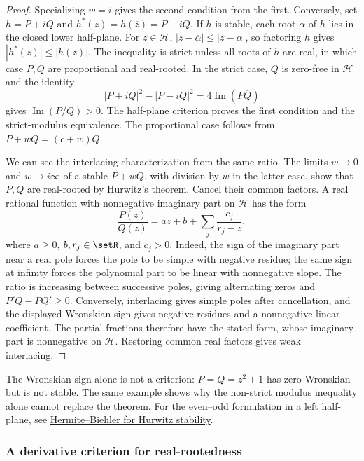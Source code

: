 \begin{proof}
Specializing $w=i$ gives the second condition from the first.
Conversely, set $h=P+iQ$ and
$h^*(z)=\overline{h(\overline z)}=P-iQ$.
If $h$ is stable, each root $\alpha$ of $h$ lies in the closed
lower half-plane. For $z\in\mathcal H$,
$|z-\overline\alpha|\leq|z-\alpha|$, so factoring $h$ gives
$|h^*(z)|\leq|h(z)|$. The inequality is strict unless all roots
of $h$ are real, in which case $P,Q$ are proportional and
real-rooted. In the strict case, $Q$ is zero-free in $\mathcal H$
and the identity
\[
 |P+iQ|^2-|P-iQ|^2=4\operatorname{Im}(P\overline Q)
\]
gives $\operatorname{Im}(P/Q)>0$.
The half-plane criterion proves the first condition and the
strict-modulus equivalence. The proportional case follows from
$P+wQ=(c+w)Q$.

We can see the interlacing characterization from the same ratio.
The limits $w\to0$ and $w\to i\infty$ of a stable $P+wQ$,
with division by $w$ in the latter case, show that $P,Q$
are real-rooted by Hurwitz's theorem. Cancel their common factors.
A real rational function with nonnegative imaginary part on
$\mathcal H$ has the form
\[
 \frac{P(z)}{Q(z)}=az+b+\sum_j\frac{c_j}{r_j-z},
\]
where $a\geq0$, $b,r_j\in\setR$, and $c_j>0$.
Indeed, the sign of the imaginary part near a real pole forces
the pole to be simple with negative residue; the same sign at
infinity forces the polynomial part to be linear with
nonnegative slope. The ratio is increasing between successive
poles, giving alternating zeros and
$P'Q-PQ'\geq0$. Conversely, interlacing gives simple poles after
cancellation, and the displayed Wronskian sign gives negative
residues and a nonnegative linear coefficient. The partial
fractions therefore have the stated form, whose imaginary part
is nonnegative on $\mathcal H$. Restoring common real factors
gives weak interlacing.
\end{proof}

The Wronskian sign alone is not a criterion: $P=Q=z^2+1$
has zero Wronskian but is not stable. The same example shows why
the non-strict modulus inequality alone cannot replace the theorem.
For the even--odd formulation in a left half-plane, see
\hyperref[hermiteBiehlerTheorem]{Hermite--Biehler for Hurwitz stability}.

\subsubsection[derivativeStabilityCriterion]{A derivative criterion for real-rootedness}

